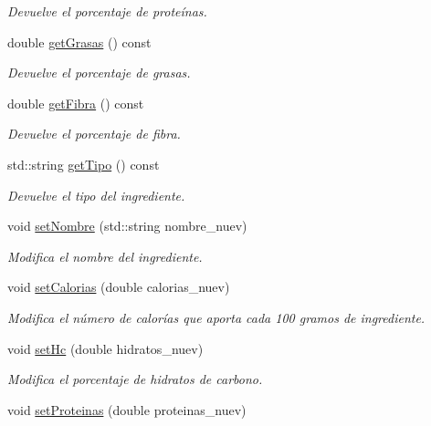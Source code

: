 \begin{DoxyCompactItemize}
\begin{DoxyCompactList}\small\item\em Devuelve el porcentaje de proteínas. \end{DoxyCompactList}\item 
double \hyperlink{classingrediente_af4639a93a991a37158d137d438db84fc}{get\+Grasas} () const
\begin{DoxyCompactList}\small\item\em Devuelve el porcentaje de grasas. \end{DoxyCompactList}\item 
double \hyperlink{classingrediente_a7abcffbf8f3a03861183514216125849}{get\+Fibra} () const
\begin{DoxyCompactList}\small\item\em Devuelve el porcentaje de fibra. \end{DoxyCompactList}\item 
std\+::string \hyperlink{classingrediente_a888b76c50c107d6ebdb6acf6afea631b}{get\+Tipo} () const
\begin{DoxyCompactList}\small\item\em Devuelve el tipo del ingrediente. \end{DoxyCompactList}\item 
void \hyperlink{classingrediente_a61e5140f7d9230ad82025590e8d7a0c1}{set\+Nombre} (std\+::string nombre\+\_\+nuev)
\begin{DoxyCompactList}\small\item\em Modifica el nombre del ingrediente. \end{DoxyCompactList}\item 
void \hyperlink{classingrediente_ab4d582503a247a6b85e6479cc3932341}{set\+Calorias} (double calorias\+\_\+nuev)
\begin{DoxyCompactList}\small\item\em Modifica el número de calorías que aporta cada 100 gramos de ingrediente. \end{DoxyCompactList}\item 
void \hyperlink{classingrediente_a15f92ad0ecb6ca0ddead6d31d63b85dc}{set\+Hc} (double hidratos\+\_\+nuev)
\begin{DoxyCompactList}\small\item\em Modifica el porcentaje de hidratos de carbono. \end{DoxyCompactList}\item 
void \hyperlink{classingrediente_a04afeb1b1b90b56a74ff9633d225157f}{set\+Proteinas} (double proteinas\+\_\+nuev)

\end{DoxyCompactItemize}

